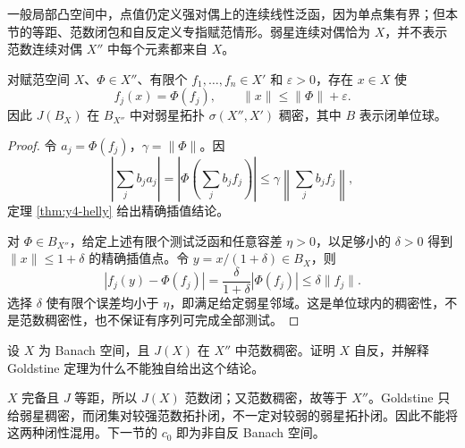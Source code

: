 一般局部凸空间中，点值仍定义强对偶上的连续线性泛函，因为单点集有界；但本节的等距、范数闭包和自反定义专指赋范情形。弱星连续对偶恰为 $X$，并不表示范数连续对偶 $X''$ 中每个元素都来自 $X$。

\begin{theorem}\label{thm:y4-goldstine}
对赋范空间 $X$、$\Phi\in X''$、有限个 $f_1,\ldots,f_n\in X'$ 和 $\varepsilon>0$，存在 $x\in X$ 使
\[
 f_j(x)=\Phi(f_j),\qquad \|x\|\le\|\Phi\|+\varepsilon.
\]
因此 $J(B_X)$ 在 $B_{X''}$ 中对弱星拓扑 $\sigma(X'',X')$ 稠密，其中 $B$ 表示闭单位球。
\end{theorem}
\begin{proof}
令 $a_j=\Phi(f_j)$，$\gamma=\|\Phi\|$。因
\[
 \left|\sum_jb_ja_j\right|
 =\left|\Phi\left(\sum_jb_jf_j\right)\right|
 \le\gamma\left\|\sum_jb_jf_j\right\|,
\]
定理 \ref{thm:y4-helly} 给出精确插值结论。

对 $\Phi\in B_{X''}$，给定上述有限个测试泛函和任意容差 $\eta>0$，以足够小的 $\delta>0$ 得到 $\|x\|\le1+\delta$ 的精确插值点。令 $y=x/(1+\delta)\in B_X$，则
\[
 |f_j(y)-\Phi(f_j)|
 =\frac{\delta}{1+\delta}|\Phi(f_j)|\le\delta\|f_j\|.
\]
选择 $\delta$ 使有限个误差均小于 $\eta$，即满足给定弱星邻域。这是单位球内的稠密性，不是范数稠密性，也不保证有序列可完成全部测试。
\end{proof}

\begin{exercise}
设 $X$ 为 Banach 空间，且 $J(X)$ 在 $X''$ 中范数稠密。证明 $X$ 自反，并解释 Goldstine 定理为什么不能独自给出这个结论。
\end{exercise}
\begin{solution}
$X$ 完备且 $J$ 等距，所以 $J(X)$ 范数闭；又范数稠密，故等于 $X''$。Goldstine 只给弱星稠密，而闭集对较强范数拓扑闭，不一定对较弱的弱星拓扑闭。因此不能将这两种闭性混用。下一节的 $c_0$ 即为非自反 Banach 空间。
\end{solution}
